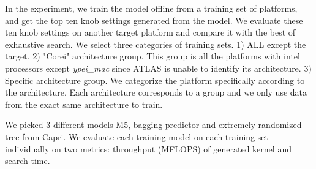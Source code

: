 In the experiment, we train the model offline from a training set of platforms, and get the top ten knob settings generated from the model.
We evaluate these ten knob settings on another target platform and compare it with the best of exhaustive search. We select 
three categories of training sets. 1) ALL except the target. 2) "Corei" architecture group. This group is all the platforms 
with intel processors except \textit{ypei\_mac} since ATLAS is unable to identify its architecture. 3) Specific architecture group.
We categorize the platform specifically according to the architecture. Each architecture corresponds to a group and we only use data 
from the exact same architecture to train. \par

We picked 3 different models M5, bagging predictor and extremely randomized tree from Capri. We evaluate each training model on each training 
set individually on two metrics: throughput (MFLOPS) of generated kernel and search time.



